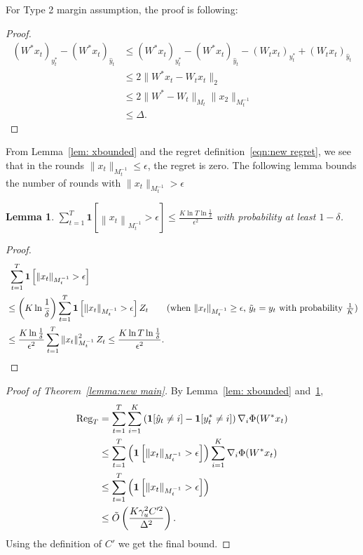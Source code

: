 \documentclass{article}
\newcommand{\Reg}{\text{\rm Reg}}
\newcommand{\one}{\boldsymbol{1}}
\newcommand{\norm}[1]{\left\|{#1}\right\|}
\newtheorem{lemma}[theorem]{Lemma}
\begin{document}
{\color{blue} For Type 2 margin assumption, the proof is following:  
\begin{proof}
\begin{align*}
    (W^*x_t)_{y_t^*} - (W^*x_t)_{\hat{y}_t} &\leq (W^*x_t)_{y_t^*} - (W^*x_t)_{\hat{y}_t} - (W_tx_t)_{y_t^*} + (W_tx_t)_{\hat{y}_t} \\
    &\leq 2\|W^*x_t-W_tx_t\|_2\\
    & \leq 2 \|W^*-W_t\|_{M_t}\|x_2\|_{M_t^{-1}} \\
    & \leq \Delta.
\end{align*}
\end{proof}
}

From Lemma~\ref{lem: xbounded} and the regret definition~\eqref{eqn:new regret}, we see that in the rounds $\|x_t\|_{M_t^{-1}}\leq \epsilon$, the regret is zero. The following lemma bounds the number of rounds with $\|x_t\|_{M_t^{-1}} > \epsilon $

\begin{lemma}
\label{lem:N}
$ \sum_{t=1}^T \one\left[\norm{x_t}_{M_t^{-1}}> \epsilon\right] \leq \frac{K\ln T\ln \frac{1}{\delta}}{\epsilon^2}$ with probability at least $1-\delta$. 
\end{lemma}

\begin{proof}
\begin{align*}
    &~ \sum_{t=1}^T \one\left[\norm{x_t}_{M_t^{-1}}> \epsilon\right]\\
    &\leq \left(K\ln \frac{1}{\delta}\right)\sum_{t=1}^T \one\left[\norm{x_t}_{M_t^{-1}}> \epsilon\right]Z_t \tag{when $\|x_t\|_{M_t^{-1}}\geq \epsilon$, $\tilde{y}_t=y_t$ with probability $\frac{1}{K}$} \\
    & \leq \frac{K\ln \frac{1}{\delta}}{\epsilon^2}\sum_{t=1}^T \norm{x_t}_{M_t^{-1}}^2 Z_t \leq \frac{K\ln T\ln \frac{1}{\delta}}{\epsilon^2}. 
\end{align*}
\end{proof}

\begin{proof}[Proof of Theorem~\ref{lemma:new main}]
    By Lemma~\ref{lem: xbounded} and~\ref{lem:N}, 
    \begin{align*}
        \Reg_T &= \sum_{t=1}^T \sum_{i=1}^K \left(\one[\hat{y}_t\neq i] - \one[y^*_t\neq i]\right)\nabla_i\Phi(W^*x_t) \\
        & \leq \sum_{t=1}^T \left(\one\left[\|x_t\|_{M_t^{-1}}>\epsilon\right]\right) \sum_{i=1}^K \nabla_i\Phi(W^*x_t) \\
        & \leq \sum_{t=1}^T \left(\one\left[\|x_t\|_{M_t^{-1}}>\epsilon\right]\right) \\
        & \leq \tilde{O}\left( \frac{K\gamma_u^2C'^2}{\Delta^2} \right). 
    \end{align*}
    Using the definition of $C'$ we get the final bound. 
\end{proof}
\end{document}
